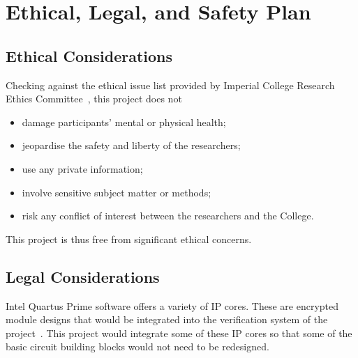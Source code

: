 \section{Ethical, Legal, and Safety Plan}

\subsection{Ethical Considerations}

Checking against the ethical issue list provided by Imperial College Research
Ethics Committee~\cite{Imperial1}, this project does not
\begin{itemize}
  \item damage participants' mental or physical health;
  \item jeopardise the safety and liberty of the researchers;
  \item use any private information;
  \item involve sensitive subject matter or methods;
  \item risk any conflict of interest between the researchers and the College.
\end{itemize}
This project is thus free from significant ethical concerns.

\subsection{Legal Considerations}
Intel Quartus Prime software offers a variety of IP cores.
These are encrypted module designs that would be integrated into the
verification system of the project~\cite{Intel2}.
This project would integrate some of these IP cores so that some of the basic
circuit building blocks would not need to be redesigned.

